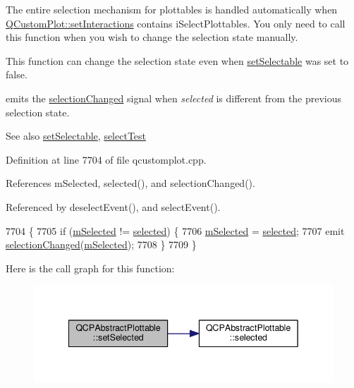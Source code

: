The entire selection mechanism for plottables is handled automatically when \hyperlink{class_q_custom_plot_a5ee1e2f6ae27419deca53e75907c27e5}{Q\+Custom\+Plot\+::set\+Interactions} contains i\+Select\+Plottables. You only need to call this function when you wish to change the selection state manually.

This function can change the selection state even when \hyperlink{class_q_c_p_abstract_plottable_a22c69299eb5569e0f6bf084877a37dc4}{set\+Selectable} was set to false.

emits the \hyperlink{class_q_c_p_abstract_plottable_a3af66432b1dca93b28e00e78a8c7c1d9}{selection\+Changed} signal when {\itshape selected} is different from the previous selection state.

\begin{DoxySeeAlso}{See also}
\hyperlink{class_q_c_p_abstract_plottable_a22c69299eb5569e0f6bf084877a37dc4}{set\+Selectable}, \hyperlink{class_q_c_p_abstract_plottable_a38efe9641d972992a3d44204bc80ec1d}{select\+Test} 
\end{DoxySeeAlso}


Definition at line 7704 of file qcustomplot.\+cpp.



References m\+Selected, selected(), and selection\+Changed().



Referenced by deselect\+Event(), and select\+Event().


\begin{DoxyCode}
7704                                                     \{
7705   \textcolor{keywordflow}{if} (\hyperlink{class_q_c_p_abstract_plottable_a43f68a0603e9bcd016bdfa6d9d5c41c9}{mSelected} != \hyperlink{class_q_c_p_abstract_plottable_ab901903adcb0e29467d63de72340ab29}{selected}) \{
7706     \hyperlink{class_q_c_p_abstract_plottable_a43f68a0603e9bcd016bdfa6d9d5c41c9}{mSelected} = \hyperlink{class_q_c_p_abstract_plottable_ab901903adcb0e29467d63de72340ab29}{selected};
7707     emit \hyperlink{class_q_c_p_abstract_plottable_a3af66432b1dca93b28e00e78a8c7c1d9}{selectionChanged}(\hyperlink{class_q_c_p_abstract_plottable_a43f68a0603e9bcd016bdfa6d9d5c41c9}{mSelected});
7708   \}
7709 \}
\end{DoxyCode}


Here is the call graph for this function\+:\nopagebreak
\begin{figure}[H]
\begin{center}
\leavevmode
\includegraphics[width=342pt]{class_q_c_p_abstract_plottable_afbd5428c2952f59d952e11ab5cd79176_cgraph}
\end{center}
\end{figure}




